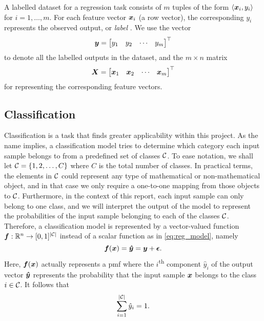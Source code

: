 \documentclass[../main.tex]{subfiles}
\begin{document}
A labelled dataset for a regression task consists of $m$ tuples of the form
$\langle {\bm{x}}_i, y_i\rangle$
for $i=1,\dots,m$.
For each feature vector ${\bm{x}}_i$ (a row vector), the corresponding $y_i$ represents the observed output, or \emph{label} \cite{burkov2019}.
We use the vector
\begin{equation}
    \label{eq:sup_learn_target}
    {\bm{y}} = \begin{bmatrix}
        y_1 & y_2 & \cdots & y_m
    \end{bmatrix}^\top
\end{equation}
to denote all the labelled outputs in the dataset, and the $m \times n$ matrix
\begin{equation}
    \label{eq:sup_learn_input_matrix}
    {\bm{X}} = \begin{bmatrix}
        {\bm{x}}_1 & {\bm{x}}_2 & \cdots & {\bm{x}}_m
    \end{bmatrix}^\top
\end{equation}
for representing the corresponding feature vectors.

\subsection{Classification}
\label{sec:background_classification}
Classification is a task that finds greater applicability within this project.
As the name implies, a classification model tries to determine which category each input sample belongs to from a predefined set of classes ${\mathcal{C}}$.
To ease notation, we shall let ${\mathcal{C}}=\{1, 2, \dots, C\}$ where $C$ is the total number of classes.
In practical terms, the elements in ${\mathcal{C}}$ could represent any type of mathematical or non-mathematical object, and in that case we only require a one-to-one mapping from those objects to ${\mathcal{C}}$.
Furthermore, in the context of this report, each input sample can only belong to one class, and we will interpret the output of the model to represent the probabilities of the input sample belonging to each of the classes ${\mathcal{C}}$.
Therefore, a classification model is represented by a vector-valued function
${\bm{f}} : \mathbb{R}^n \rightarrow [0,1]^{\lvert{\mathcal{C}}\rvert}$
instead of a scalar function as in \cref{eq:reg_model}, namely
\begin{equation}
    \label{eq:cla_model}
    {\bm{f}}({\bm{x}}) = {\bm{\hat{y}}} = {\bm{y}} + \bm{\epsilon}.
\end{equation}
Here, ${\bm{f}}({\bm{x}})$ actually represents a \gls{pmf} where the $i$\textsuperscript{th} component $\hat{y}_i$ of the output vector ${\bm{\hat{y}}}$ represents the probability that the input sample ${\bm{x}}$ belongs to the class $i\in {\mathcal{C}}$.
It follows that
\begin{equation}
    \label{eq:pmf}
    \sum_{i=1}^{\lvert{\mathcal{C}}\rvert} \hat{y}_i = 1.
\end{equation}
\end{document}
